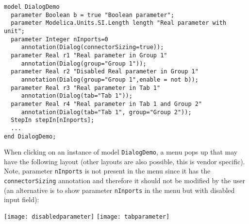 \begin{example}
\begin{lstlisting}[language=modelica]
model DialogDemo
  parameter Boolean b = true "Boolean parameter";
  parameter Modelica.Units.SI.Length length "Real parameter with unit";
  parameter Integer nInports=0
     annotation(Dialog(connectorSizing=true));
  parameter Real r1 "Real parameter in Group 1"
     annotation(Dialog(group="Group 1"));
  parameter Real r2 "Disabled Real parameter in Group 1"
     annotation(Dialog(group="Group 1",enable = not b));
  parameter Real r3 "Real parameter in Tab 1"
     annotation(Dialog(tab="Tab 1"));
  parameter Real r4 "Real parameter in Tab 1 and Group 2"
     annotation(Dialog(tab="Tab 1", group="Group 2"));
  StepIn stepIn[nInports];
  ...
end DialogDemo;
\end{lstlisting}
When clicking on an instance of model \lstinline!DialogDemo!, a menu pops up
that may have the following layout (other layouts are also possible,
this is vendor specific). Note, parameter \lstinline!nInports! is not present in the
menu since it has the \lstinline!connectorSizing! annotation and therefore it
should not be modified by the user (an alternative is to show parameter
\lstinline!nInports! in the menu but with disabled input field):

\texttt{[image: disabledparameter]}
\texttt{[image: tabparameter]}\\
\end{example}

